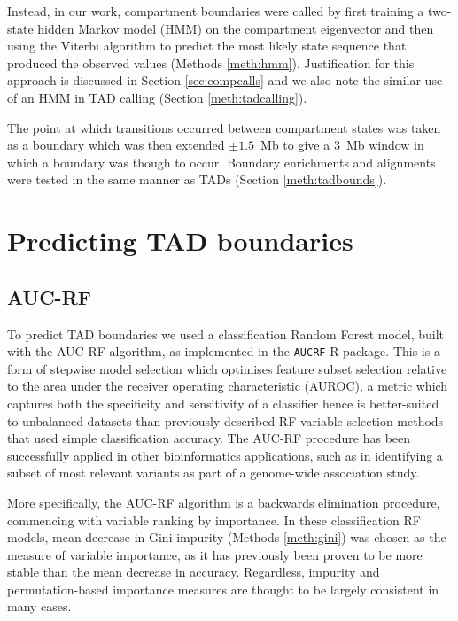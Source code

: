 \documentclass[a4paper,11pt,oneside]{book}
\begin{document}
Instead, in our work, compartment boundaries were called by first training a two-state hidden
Markov model (HMM) on the compartment eigenvector and then using the
Viterbi algorithm to predict the most likely state sequence that
produced the observed values (Methods \ref{meth:hmm}). Justification for this approach is discussed in Section \ref{sec:compcalls} and we also note the similar use of an HMM in TAD calling (Section \ref{meth:tadcalling}).

The point at which transitions occurred between compartment states was taken as a boundary which was then extended $\pm 1.5$~Mb to give a $3$~Mb window in which a boundary was though to occur. Boundary enrichments and alignments were tested in the same manner as TADs (Section \ref{meth:tadbounds}).


\section{Predicting TAD boundaries}\label{meth:tadpred}

\subsection{AUC-RF}\label{meth:aucrf}

To predict TAD boundaries we used a classification Random Forest model, built with the AUC-RF algorithm,\cite{Calle2011} as implemented in the \texttt{AUCRF} R package.\cite{aucrf} This is a form of stepwise model selection which optimises feature subset selection relative to the area under the receiver operating characteristic (AUROC), a metric which captures both the specificity and sensitivity of a classifier hence is better-suited to unbalanced datasets than previously-described RF variable selection methods that used simple classification accuracy.\cite{Diaz2006, Chen2012} The AUC-RF procedure has been successfully applied in other bioinformatics applications, such as in identifying a subset of most relevant variants as part of a genome-wide association study.\cite{DeMaturana2013} 

More specifically, the AUC-RF algorithm is a backwards elimination procedure, commencing with variable ranking by importance. In these classification RF models, mean decrease in Gini impurity (Methods \ref{meth:gini}) was chosen as the measure of variable importance, as it has previously been proven to be more stable than the mean decrease in accuracy.\cite{Calle2011} Regardless, impurity and permutation-based importance measures are thought to be largely consistent in many cases.\cite{Liaw2002, Hastie2001}
\end{document}
